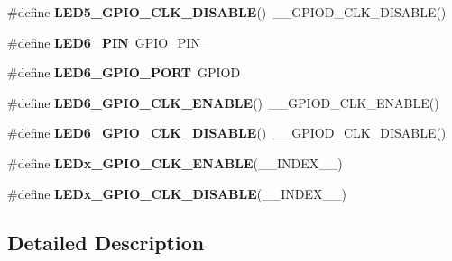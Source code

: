 \begin{DoxyCompactItemize}
\item 
\mbox{\label{group___s_t_m32_f4___d_i_s_c_o_v_e_r_y___l_o_w___l_e_v_e_l___l_e_d_gab128b562dd360453130623d068c97845}} 
\#define {\bfseries L\+E\+D5\+\_\+\+G\+P\+I\+O\+\_\+\+C\+L\+K\+\_\+\+D\+I\+S\+A\+B\+LE}()~\+\_\+\+\_\+\+G\+P\+I\+O\+D\+\_\+\+C\+L\+K\+\_\+\+D\+I\+S\+A\+B\+LE()
\item 
\mbox{\label{group___s_t_m32_f4___d_i_s_c_o_v_e_r_y___l_o_w___l_e_v_e_l___l_e_d_ga671c4f0e7ed8fbbfecc92cf6bdd0d588}} 
\#define {\bfseries L\+E\+D6\+\_\+\+P\+IN}~G\+P\+I\+O\+\_\+\+P\+I\+N\+\_
\item 
\mbox{\label{group___s_t_m32_f4___d_i_s_c_o_v_e_r_y___l_o_w___l_e_v_e_l___l_e_d_ga60dcbcf75e3ee091c1512f6ca9e00722}} 
\#define {\bfseries L\+E\+D6\+\_\+\+G\+P\+I\+O\+\_\+\+P\+O\+RT}~G\+P\+I\+OD
\item 
\mbox{\label{group___s_t_m32_f4___d_i_s_c_o_v_e_r_y___l_o_w___l_e_v_e_l___l_e_d_gad289eae5d15816c0878ad7f3b629b3ba}} 
\#define {\bfseries L\+E\+D6\+\_\+\+G\+P\+I\+O\+\_\+\+C\+L\+K\+\_\+\+E\+N\+A\+B\+LE}()~\+\_\+\+\_\+\+G\+P\+I\+O\+D\+\_\+\+C\+L\+K\+\_\+\+E\+N\+A\+B\+LE()
\item 
\mbox{\label{group___s_t_m32_f4___d_i_s_c_o_v_e_r_y___l_o_w___l_e_v_e_l___l_e_d_gab47139e680675f0f703ed24ca2eb7979}} 
\#define {\bfseries L\+E\+D6\+\_\+\+G\+P\+I\+O\+\_\+\+C\+L\+K\+\_\+\+D\+I\+S\+A\+B\+LE}()~\+\_\+\+\_\+\+G\+P\+I\+O\+D\+\_\+\+C\+L\+K\+\_\+\+D\+I\+S\+A\+B\+LE()
\item 
\#define {\bfseries L\+E\+Dx\+\_\+\+G\+P\+I\+O\+\_\+\+C\+L\+K\+\_\+\+E\+N\+A\+B\+LE}(\+\_\+\+\_\+\+I\+N\+D\+E\+X\+\_\+\+\_\+)
\item 
\#define {\bfseries L\+E\+Dx\+\_\+\+G\+P\+I\+O\+\_\+\+C\+L\+K\+\_\+\+D\+I\+S\+A\+B\+LE}(\+\_\+\+\_\+\+I\+N\+D\+E\+X\+\_\+\+\_\+)
\end{DoxyCompactItemize}


\subsection{Detailed Description}


